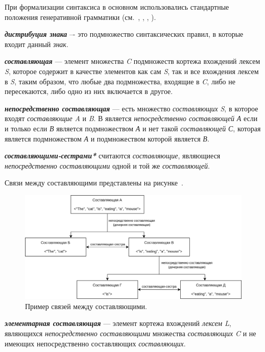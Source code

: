 При формализации синтаксиса в основном использовались стандартные положения генеративной грамматики (см.~, , , ).

\textbf{\textit{дистрибуция знака}} –- это подмножество синтаксических правил, в которые входит данный \textit{знак}.

\textbf{\textit{составляющая}} --- элемент множества \textit{C} подмножеств кортежа вхождений лексем \textit{S}, которое содержит в качестве элементов как сам \textit{S}, так и все вхождения лексем в \textit{S}, таким образом, что любые два подмножества, входящие в \textit{C}, либо не пересекаются, либо одно из них включается в другое.

\textbf{\textit{непосредственно составляющая}} ---  есть множество \textit{составляющих} \textit{S}, в которое входят \textit{составляющие} \textit{A} и \textit{B}. В является \textit{непосредственно составляющей} \textit{А} если и только если \textit{В} является подмножеством \textit{А} и нет такой \textit{составляющей} \textit{С}, которая является подмножеством \textit{А} и подмножеством которой является \textit{В}.

\textbf{\textit{составляющими-сестрами*}} считаются \textit{составляющие}, являющиеся \textit{непосредственно составляющими} одной и той же \textit{составляющей}.

Связи между составляющими представлены на рисунке~\textit{}.

\begin{figure}[h]
    \centering
    \includegraphics[scale=0.25]{images/part2/chapter_lang/syntactic_example}
    \caption{Пример связей между составляющими.}
    \label{fig:syntactic_example}
\end{figure}

\textbf{\textit{элементарная составляющая}} --- элемент кортежа вхождений \textit{лексем} \textit{L}, являющихся \textit{непосредственно составляющими} множества \textit{составляющих} \textit{C} и не имеющих непосредственно составляющих \textit{составляющих}.

